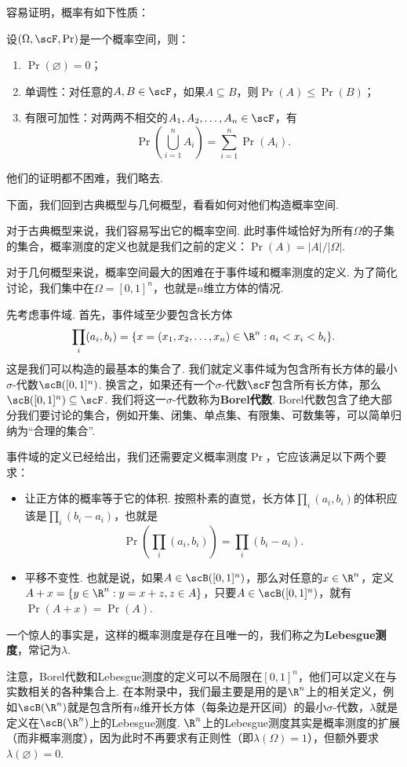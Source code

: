 容易证明，概率有如下性质：
\begin{proposition}
设$(\Omega,\scF,\Pr)$是一个概率空间，则：
\begin{enumerate}
    \item $\Pr(\varnothing)=0$；
    \item 单调性：对任意的$A,B\in\scF$，如果$A\subseteq B$，则$\Pr(A)\leq\Pr(B)$；
    \item 有限可加性：对两两不相交的$A_1,A_2,\dots,A_n\in\scF$，有
    \[
        \Pr\left(\bigcup_{i=1}^n A_i\right) = \sum_{i=1}^n \Pr(A_i).
    \]
\end{enumerate}
\end{proposition}

他们的证明都不困难，我们略去. 

下面，我们回到古典概型与几何概型，看看如何对他们构造概率空间.  

对于古典概型来说，我们容易写出它的概率空间. 此时事件域恰好为所有$\Omega$的子集的集合，概率测度的定义也就是我们之前的定义：$\Pr(A)=|A|/|\Omega|$. 

对于几何概型来说，概率空间最大的困难在于事件域和概率测度的定义. 为了简化讨论，我们集中在$\Omega=[0,1]^n$，也就是$n$维立方体的情况. 

先考虑事件域. 首先，事件域至少要包含长方体
\[\prod_i(a_i,b_i)=\{x=(x_1,x_2,\ldots,x_n)\in\R^n:a_i<x_i<b_i\}.\]
这是我们可以构造的最基本的集合了. 我们就定义事件域为包含所有长方体的最小$\sigma$-代数$\scB([0,1]^n)$. 换言之，如果还有一个$\sigma$-代数$\scF$包含所有长方体，那么$\scB([0,1]^n)\subseteq\scF$. 我们将这一$\sigma$-代数称为\textbf{Borel代数}. Borel代数包含了绝大部分我们要讨论的集合，例如开集、闭集、单点集、有限集、可数集等，可以简单归纳为“合理的集合”. 

事件域的定义已经给出，我们还需要定义概率测度$\Pr$，它应该满足以下两个要求：
\begin{itemize}
    \item 让正方体的概率等于它的体积. 按照朴素的直觉，长方体$\prod_i(a_i,b_i)$的体积应该是$\prod_i(b_i-a_i)$，也就是
    \[
        \Pr\left(\prod_i(a_i,b_i)\right) = \prod_i(b_i-a_i).
    \]
    \item 平移不变性. 也就是说，如果$A\in\scB([0,1]^n)$，那么对任意的$x\in\R^n$，定义$A+x=\{y\in\R^n:y=x+z,z\in A\}$，只要$A\in\scB([0,1]^n)$，就有$\Pr(A+x)=\Pr(A)$.
\end{itemize}
一个惊人的事实是，这样的概率测度是存在且唯一的，我们称之为\textbf{Lebesgue测度}，常记为$\lambda$.

注意，Borel代数和Lebesgue测度的定义可以不局限在$[0,1]^n$，他们可以定义在与实数相关的各种集合上. 在本附录中，我们最主要是用的是$\R^n$上的相关定义，例如$\scB(\R^n)$就是包含所有$n$维开长方体（每条边是开区间）的最小$\sigma$-代数，$\lambda$就是定义在$\scB(\R^n)$上的Lebesgue测度. $\R^n$上的Lebesgue测度其实是概率测度的扩展（而非概率测度），因为此时不再要求有正则性（即$\lambda(\Omega)=1$），但额外要求$\lambda(\varnothing)=0$.

